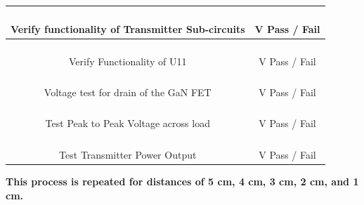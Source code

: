 \documentclass[12pt]{article}
\begin{document}
\begin{appendices}
\begin{table}[h!]
\begin{tabular}{ | c | c | }
\hline
\parbox{0.5\linewidth}{\raggedright \hfill \\[-0.25 em]
Verify functionality of Transmitter Sub-circuits \hfill \\[0.1 em]
} &  \parbox{0.4\linewidth}{\raggedright \hfill \\ [0.7 em]
\underline{\hspace{0.625in}} V  \hspace{0.125 in}Pass \space / \space  Fail \hfill \\ [0.3 em]
} \\ 
\hline
\parbox{0.5\linewidth}{\raggedright \hfill \\[-0.25 em]
Verify Functionality of U11 \hfill \\[0.1 em]
} &  \parbox{0.4\linewidth}{\raggedright \hfill \\ [0.7 em]
\underline{\hspace{0.625in}} V  \hspace{0.125 in}Pass \space / \space  Fail \hfill \\ [0.3 em]
} \\ 
\hline
\parbox{0.5\linewidth}{\raggedright \hfill \\[-0.25 em]
Voltage test for drain of the GaN FET \hfill \\[0.1 em]
} &  \parbox{0.4\linewidth}{\raggedright \hfill \\ [0.7 em]
\underline{\hspace{0.625in}} V  \hspace{0.125 in}Pass \space / \space  Fail \hfill \\ [0.3 em]
} \\ 
\hline
\parbox{0.5\linewidth}{\raggedright \hfill \\[-0.25 em]
Test Peak to Peak Voltage across load \hfill \\[0.1 em]
} &  \parbox{0.4\linewidth}{\raggedright \hfill \\ [0.7 em]
\underline{\hspace{0.625in}} V  \hspace{0.125 in}Pass \space / \space  Fail \hfill \\ [0.3 em]
} \\ 
\hline
\parbox{0.5\linewidth}{\raggedright \hfill \\[-0.25 em]
Test Transmitter Power Output \hfill \\[0.1 em]
} &  \parbox{0.4\linewidth}{\raggedright \hfill \\ [0.7 em]
\underline{\hspace{0.625in}} V  \hspace{0.125 in}Pass \space / \space  Fail \hfill \\ [0.3 em]
} \\ 
\hline
\end{tabular}
\end{table}
\noindent
\textbf{This process is repeated for distances of 5 cm, 4 cm, 3 cm, 2 cm, and 1 cm.}


\end{appendices}
\end{document}
